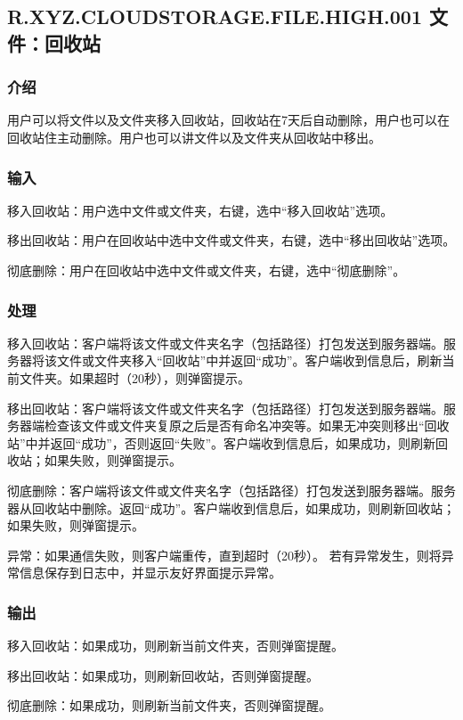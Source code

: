 \subsection{R.XYZ.CLOUDSTORAGE.FILE.HIGH.001 文件：回收站}

\subsubsection{介绍} 
用户可以将文件以及文件夹移入回收站，回收站在7天后自动删除，用户也可以在回收站住主动删除。用户也可以讲文件以及文件夹从回收站中移出。

\subsubsection{输入} 
移入回收站：用户选中文件或文件夹，右键，选中“移入回收站”选项。

移出回收站：用户在回收站中选中文件或文件夹，右键，选中“移出回收站”选项。

彻底删除：用户在回收站中选中文件或文件夹，右键，选中“彻底删除”。

\subsubsection{处理} 
移入回收站：客户端将该文件或文件夹名字（包括路径）打包发送到服务器端。服务器将该文件或文件夹移入“回收站”中并返回“成功”。客户端收到信息后，刷新当前文件夹。如果超时（20秒），则弹窗提示。

移出回收站：客户端将该文件或文件夹名字（包括路径）打包发送到服务器端。服务器端检查该文件或文件夹复原之后是否有命名冲突等。如果无冲突则移出“回收站”中并返回“成功”，否则返回“失败”。客户端收到信息后，如果成功，则刷新回收站；如果失败，则弹窗提示。

彻底删除：客户端将该文件或文件夹名字（包括路径）打包发送到服务器端。服务器从回收站中删除。返回“成功”。客户端收到信息后，如果成功，则刷新回收站；如果失败，则弹窗提示。

异常：如果通信失败，则客户端重传，直到超时（20秒）。
若有异常发生，则将异常信息保存到日志中，并显示友好界面提示异常。

\subsubsection{输出} 
移入回收站：如果成功，则刷新当前文件夹，否则弹窗提醒。

移出回收站：如果成功，则刷新回收站，否则弹窗提醒。

彻底删除：如果成功，则刷新当前文件夹，否则弹窗提醒。



